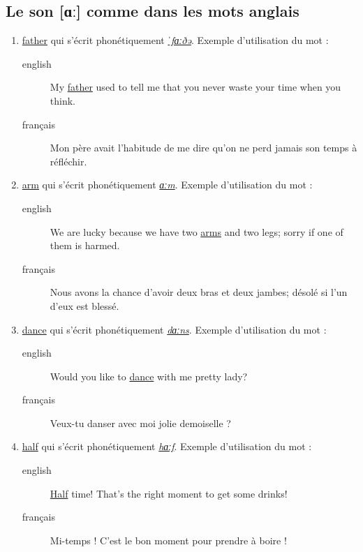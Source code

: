 \subsection{Le son [ɑː] comme dans les mots anglais}
\label{sec:org73a1177}
\begin{enumerate}
\item \href{http://www.wordreference.com/enfr/father}{father} qui s'écrit phonétiquement \href{https://en.oxforddictionaries.com/definition/father}{\emph{ˈfɑːðə}}. Exemple d'utilisation du mot :
\begin{description}
\item[{english}] \textenglish{My \href{https://youtu.be/MZDAUbeSwNY}{father} used to tell me that you never waste your
time when you think.}
\item[{français}] Mon père avait l'habitude de me dire qu'on ne perd
jamais son temps à réfléchir.
\end{description}
\item \href{http://www.wordreference.com/enfr/arm}{arm} qui s'écrit phonétiquement \href{https://en.oxforddictionaries.com/definition/arm}{\emph{ɑːm}}. Exemple d'utilisation du mot :
\begin{description}
\item[{english}] \textenglish{We are lucky because we have two \href{https://youtu.be/tlhQghmuMf8}{arms} and two legs;
sorry if one of them is harmed.}
\item[{français}] Nous avons la chance d'avoir deux bras et deux
jambes; désolé si l'un d'eux est blessé.
\end{description}
\item \href{http://www.wordreference.com/enfr/dance}{dance} qui s'écrit phonétiquement \href{https://en.oxforddictionaries.com/definition/dance}{\emph{dɑːns}}. Exemple d'utilisation du mot :
\begin{description}
\item[{english}] \textenglish{Would you like to \href{https://youtu.be/aagbeWUDe7w}{dance} with me pretty lady?}
\item[{français}] Veux-tu danser avec moi jolie demoiselle ?
\end{description}
\item \href{http://www.wordreference.com/enfr/half}{half} qui s'écrit phonétiquement \href{https://en.oxforddictionaries.com/definition/half}{\emph{hɑːf}}. Exemple d'utilisation du mot :
\begin{description}
\item[{english}] \textenglish{\href{https://youtu.be/XWamnSNgiCM}{Half} time! That's the right moment to get some drinks!}
\item[{français}] Mi-temps ! C'est le bon moment pour prendre à boire !
\end{description}
\end{enumerate}
